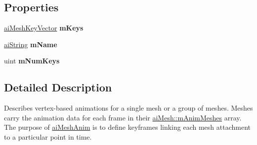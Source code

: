 \subsection*{Properties}
\begin{DoxyCompactItemize}
\item 
\hypertarget{structai_mesh_anim_ad07287e3ba48eda23655d4d09344783f}{\hyperlink{classai_mesh_key_vector}{ai\+Mesh\+Key\+Vector} {\bfseries m\+Keys}}\label{structai_mesh_anim_ad07287e3ba48eda23655d4d09344783f}

\item 
\hypertarget{structai_mesh_anim_a1a70d7f31cdbfa00b4c104fa4b0ffaea}{\hyperlink{structai_string}{ai\+String} {\bfseries m\+Name}}\label{structai_mesh_anim_a1a70d7f31cdbfa00b4c104fa4b0ffaea}

\item 
\hypertarget{structai_mesh_anim_aaa1884033f6f6b9f4500bb1eeb19cdcf}{uint {\bfseries m\+Num\+Keys}}\label{structai_mesh_anim_aaa1884033f6f6b9f4500bb1eeb19cdcf}

\end{DoxyCompactItemize}


\subsection{Detailed Description}
Describes vertex-\/based animations for a single mesh or a group of meshes. Meshes carry the animation data for each frame in their \hyperlink{structai_mesh_a5078f7db7e99ed05db89dfa412f0e990}{ai\+Mesh\+::m\+Anim\+Meshes} array. The purpose of \hyperlink{structai_mesh_anim}{ai\+Mesh\+Anim} is to define keyframes linking each mesh attachment to a particular point in time. 


